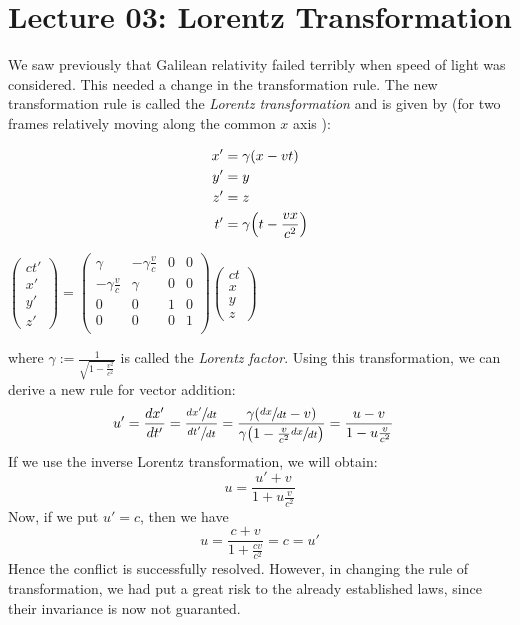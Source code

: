 \section*{Lecture 03: Lorentz Transformation}
We saw previously that Galilean relativity failed terribly when speed of light was considered. This needed a change in the transformation rule. The new transformation rule is called the \textit{Lorentz transformation} and is given by (for two frames relatively moving along the common $x$ axis ):
\begin{center}
     \begin{minipage}{0.5\textwidth}
    \begin{align*}
        x' &= \gamma \qty(x-vt)\\
        y'&=y\\
        z' &=z \\
        t'&=\gamma\qty(t-\frac{vx}{c^2})
    \end{align*}
\end{minipage}\hfill
\begin{minipage}{0.5\textwidth}
    
    
    $\begin{pmatrix}
        ct'\\x'\\y'\\z'
    \end{pmatrix} = \begin{pmatrix}
        \gamma & -\gamma \frac{v}{c}&0&0 \\
        -\gamma \frac{v}{c}& \gamma &0&0 \\
        0&0&1&0 \\
        0&0&0&1 \\
    \end{pmatrix}    \begin{pmatrix}
        ct\\x\\y\\z
    \end{pmatrix}$
\end{minipage}
   \end{center}
   where $\gamma := \frac{1}{\sqrt{1-\frac{v^2}{c^2}}}$ is called the \textit{Lorentz factor}. Using this transformation, we can derive a new rule for vector addition:
   \begin{align*}
    u' &= \frac{dx'}{dt'} = \frac{\sfrac{dx'}{dt}}{\sfrac{dt'}{dt}}=\frac{\gamma\qty(\sfrac{dx}{dt}-v)}{\gamma\qty(1- \frac{v}{c^2}\sfrac{dx}{dt})} = \frac{u-v}{1 - u \frac{v}{c^2}}
   \end{align*}
   If we use the inverse Lorentz transformation, we will obtain:
   $$u = \frac{u'+v}{1 + u \frac{v}{c^2}}$$
   Now, if we put $u'=c$, then we have $$u = \frac{c+v}{1+\frac{cv}{c^2}} = c = u'$$ 
   Hence the conflict is successfully resolved. However, in changing the rule of transformation, we had put a great risk to the already established laws, since their invariance is now not guaranted.
